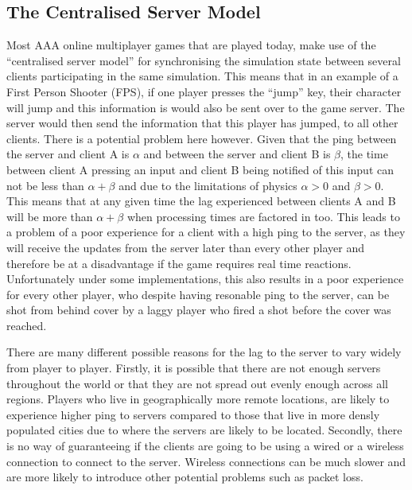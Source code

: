 \subsection{The Centralised Server Model}
Most AAA online multiplayer games that are played today, make use of the ``centralised server model'' for synchronising the simulation state between several clients participating in the same simulation. This means that in an example of a First Person Shooter (FPS), if one player presses the ``jump'' key, their character will jump and this information is would also be sent over to the game server. The server would then send the information that this player has jumped, to all other clients. There is a potential problem here however. Given that the ping between the server and client A is \(\alpha\) and between the server and client B is \(\beta\), the time between client A pressing an input and client B being notified of this input can not be less than $\alpha+\beta$ and due to the limitations of physics $\alpha>0$ and $\beta>0$. This means that at any given time the lag experienced between clients A and B will be more than $\alpha+\beta$ when processing times are factored in too. This leads to a problem of a poor experience for a client with a high ping to the server, as they will receive the updates from the server later than every other player and therefore be at a disadvantage if the game requires real time reactions. Unfortunately under some implementations, this also results in a poor experience for every other player, who despite having resonable ping to the server, can be shot from behind cover by a laggy player who fired a shot before the cover was reached.

There are many different possible reasons for the lag to the server to vary widely from player to player. Firstly, it is possible that there are not enough servers throughout the world or that they are not spread out evenly enough across all regions. Players who live in geographically more remote locations, are likely to experience higher ping to servers compared to those that live in more densly populated cities due to where the servers are likely to be located. Secondly, there is no way of guaranteeing if the clients are going to be using a wired or a wireless connection to connect to the server. Wireless connections can be much slower and are more likely to introduce other potential problems such as packet loss.


